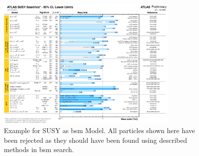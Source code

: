 \documentclass[../Bachelorarbeit.tex]{subfiles}
\begin{document}
\begin{figure}[h]
    \centering
    \includegraphics[width=0.8\textwidth]{images/fig_23_ATLAS_SUSY.png}
    \caption{Example for SUSY as \acrshort{bsm} Model. All particles shown here have been rejected as they should have been found using described methods in \acrshort{bsm} search.  \cite{.07.06.2021}}
    \label{fig:ATLAS_SUSY}
\end{figure}
\end{document}
